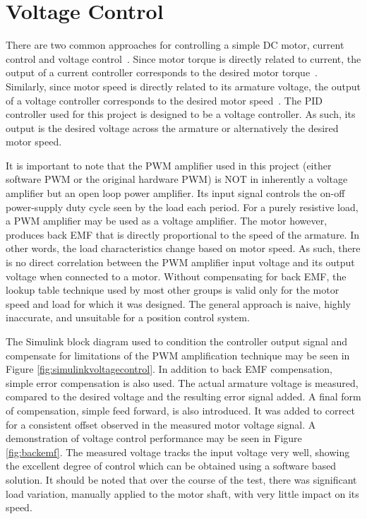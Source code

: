 \section{Voltage Control}
\label{sec:voltagecontrol}

There are two common approaches for controlling a simple DC motor, current control and voltage control~\cite{motorControl}.
Since motor torque is directly related to current, the output of a current controller corresponds to the desired motor torque~\cite{current}.
Similarly, since motor speed is directly related to its armature voltage, the output of a voltage controller corresponds to the desired motor speed~\cite{voltage}.
The PID controller used for this project is designed to be a voltage controller.
As such, its output is the desired voltage across the armature or alternatively the desired motor speed.

It is important to note that the PWM amplifier used in this project (either software PWM or the original hardware PWM) is NOT in inherently a voltage amplifier but an open loop power amplifier.
Its input signal controls the on-off power-supply duty cycle seen by the load each period. 
For a purely resistive load, a PWM amplifier may be used as a voltage amplifier.
The motor however, produces back EMF that is directly proportional to the speed of the armature.
In other words, the load characteristics change based on motor speed.
As such, there is no direct correlation between the PWM amplifier  input voltage and its output voltage when connected to a motor.
Without compensating for back EMF, the lookup table technique used by most other groups is valid only for the motor speed and load for which it was designed. 
The general approach is naive, highly inaccurate, and unsuitable for a position control system.

The Simulink block diagram used to condition the controller output signal and compensate for limitations of the PWM amplification technique may be seen in Figure \ref{fig:simulinkvoltagecontrol}.
In addition to back EMF compensation, simple error compensation is also used.
The actual armature voltage is measured, compared to the desired voltage and the resulting error signal added.
A final form of compensation, simple feed forward, is also introduced.
It was added to correct for a consistent offset observed in the measured motor voltage signal.
A demonstration of voltage control performance may be seen in Figure \ref{fig:backemf}. 
The measured voltage tracks the input voltage very well, showing the excellent degree of control which can be obtained using a software based solution.
It should be noted that over the course of the test, there was significant load variation, manually applied to the motor shaft, with very little impact on its speed.

